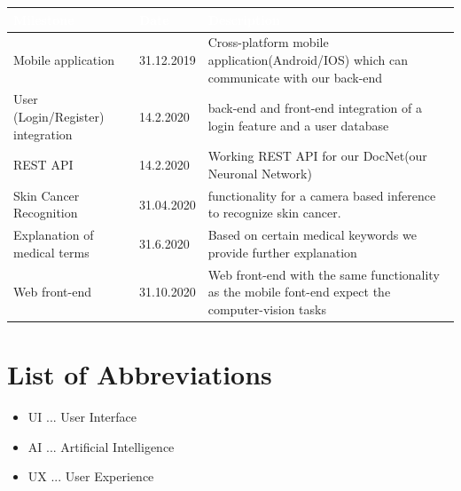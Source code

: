 \documentclass[12pt]{article}
\theoremstyle{definition}
\begin{document}
\begin{left}
    \begin{tabular}{ | m{6cm} | m{2cm}| m{8cm} | } 
    \hline
    \cellcolor[gray]{0.5}\textcolor{white}{Milestone} & \cellcolor[gray]{0.5}\textcolor{white}{Date} & \cellcolor[gray]{0.5}\textcolor{white}{Description} \\ \hline
    \hline
    Mobile application & 31.12.2019 & Cross-platform mobile application(Android/IOS) which can communicate with our back-end \\ 
    \hline
    User (Login/Register) integration  & 14.2.2020 & back-end and front-end integration of a login feature and a user database \\
    \hline
    REST API & 14.2.2020 & Working REST API for our DocNet(our Neuronal Network) \\ 
    \hline
    Skin Cancer Recognition & 31.04.2020 & functionality for a camera based inference to recognize skin cancer.\\ 
    \hline
    Explanation of medical terms & 31.6.2020 & Based on certain medical keywords we provide further explanation \\ 
    \hline
    Web front-end & 31.10.2020 & Web front-end with the same functionality as the mobile font-end expect the computer-vision tasks \\ 
    \hline
    \end{tabular}
\end{left}


\pagebreak


\section{List of Abbreviations}

\begin{itemize}
    \item UI ... User Interface
    \item AI ... Artificial Intelligence
    \item UX ... User Experience
\end{itemize}
\end{document}
